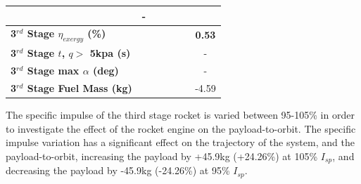 \begin{table}[ht]
\begin{tabular}{l c c c c c c}
		& -
		\\
		\hline 
		\textbf{3$^{rd}$ Stage $\eta_{exergy}$ (\%)}
		& \textbf{\thirddExergyEffTThreeNinetyNoReturn}
		& \textbf{\thirddExergyEffTThreeNinetyFiveNoReturn}
		& \textbf{\thirddExergyEffTThreeStandardNoReturn}
		& \textbf{\thirddExergyEffTThreeOneHundredFiveNoReturn}
		& \textbf{\thirddExergyEffTThreeOneHundredTenNoReturn}
		& \textbf{0.53}
		\\
		\textbf{3$^{rd}$ Stage $t$, $q >$ 5kpa (s)}
		& \thirdqOverFiveTThreeNinetyNoReturn
		& \thirdqOverFiveTThreeNinetyFiveNoReturn
		& \thirdqOverFiveTThreeStandardNoReturn
		& \thirdqOverFiveTThreeOneHundredFiveNoReturn
		& \thirdqOverFiveTThreeOneHundredTenNoReturn
		& -
		\\
		\textbf{3$^{rd}$ Stage max $\alpha$ (deg)}
		& \thirdmaxAoATThreeNinetyNoReturn
		& \thirdmaxAoATThreeNinetyFiveNoReturn
		& \thirdmaxAoATThreeStandardNoReturn
		& \thirdmaxAoATThreeOneHundredFiveNoReturn
		& \thirdmaxAoATThreeOneHundredTenNoReturn
		& -
		\\
		\textbf{3$^{rd}$ Stage Fuel Mass (kg)}
		& \thirdmFuelTThreeNinetyNoReturn
		& \thirdmFuelTThreeNinetyFiveNoReturn
		& \thirdmFuelTThreeStandardNoReturn
		& \thirdmFuelTThreeOneHundredFiveNoReturn
		& \thirdmFuelTThreeOneHundredTenNoReturn
		&-4.59
		\\
		\hline 
	\end{tabular} 
\end{table}

The specific impulse of the third stage rocket is varied between 95-105\% in order to investigate the effect of the rocket engine on the payload-to-orbit.
The specific impulse variation has a significant effect on the trajectory of the system, and the payload-to-orbit, increasing the payload by +45.9kg (+24.26\%) at 105\% $I_{sp}$, and decreasing the payload by -45.9kg (-24.26\%) at 95\% $I_{sp}$. 

